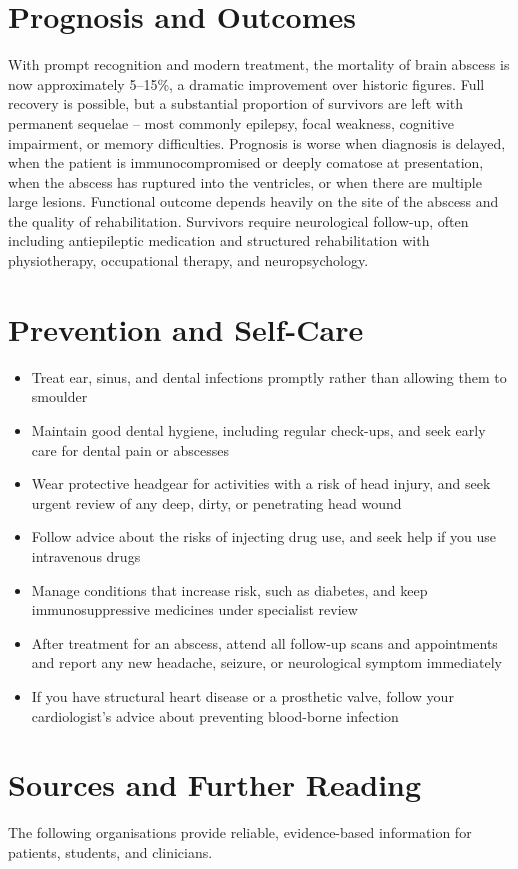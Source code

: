 \section*{Prognosis and Outcomes}
With prompt recognition and modern treatment, the mortality of brain abscess is now approximately 5--15\%, a dramatic improvement over historic figures. Full recovery is possible, but a substantial proportion of survivors are left with permanent sequelae -- most commonly epilepsy, focal weakness, cognitive impairment, or memory difficulties. Prognosis is worse when diagnosis is delayed, when the patient is immunocompromised or deeply comatose at presentation, when the abscess has ruptured into the ventricles, or when there are multiple large lesions. Functional outcome depends heavily on the site of the abscess and the quality of rehabilitation. Survivors require neurological follow-up, often including antiepileptic medication and structured rehabilitation with physiotherapy, occupational therapy, and neuropsychology.

\section*{Prevention and Self-Care}
\begin{itemize}
    \item Treat ear, sinus, and dental infections promptly rather than allowing them to smoulder
    \item Maintain good dental hygiene, including regular check-ups, and seek early care for dental pain or abscesses
    \item Wear protective headgear for activities with a risk of head injury, and seek urgent review of any deep, dirty, or penetrating head wound
    \item Follow advice about the risks of injecting drug use, and seek help if you use intravenous drugs
    \item Manage conditions that increase risk, such as diabetes, and keep immunosuppressive medicines under specialist review
    \item After treatment for an abscess, attend all follow-up scans and appointments and report any new headache, seizure, or neurological symptom immediately
    \item If you have structural heart disease or a prosthetic valve, follow your cardiologist's advice about preventing blood-borne infection
\end{itemize}

\section*{Sources and Further Reading}
The following organisations provide reliable, evidence-based information for patients, students, and clinicians.


